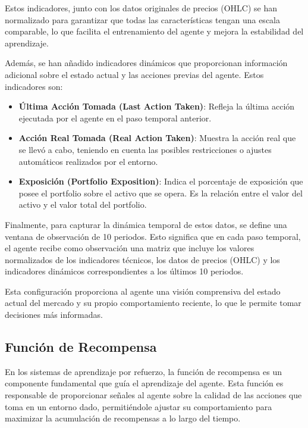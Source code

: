 \documentclass[a4paper,12pt, twoside]{report}
\begin{document}
Estos indicadores, junto con los datos originales de precios (OHLC) se han normalizado para 
garantizar que todas las características tengan una escala comparable, lo que facilita el 
entrenamiento del agente y mejora la estabilidad del aprendizaje.

Además, se han añadido indicadores dinámicos que proporcionan información adicional sobre 
el estado actual y las acciones previas del agente. Estos indicadores son:

\begin{itemize}
    \item \textbf{Última Acción Tomada (Last Action Taken)}: Refleja la última acción ejecutada 
    por el agente en el paso temporal anterior.

    \item \textbf{Acción Real Tomada (Real Action Taken)}: Muestra la acción real que se llevó a cabo, 
    teniendo en cuenta las posibles restricciones o ajustes automáticos realizados por el entorno.

    \item \textbf{Exposición (Portfolio Exposition)}: Indica el porcentaje de exposición que posee el portfolio
    sobre el activo que se opera. Es la relación entre el valor del activo y el valor total del portfolio.
\end{itemize}

Finalmente, para capturar la dinámica temporal de estos datos, se define una ventana de observación 
de 10 periodos. Esto significa que en cada paso temporal, el agente recibe como observación una 
matriz que incluye los valores normalizados de los indicadores técnicos, los datos de precios (OHLC) 
y los indicadores dinámicos correspondientes a los últimos 10 periodos. 

Esta configuración proporciona al agente una visión comprensiva del estado actual del mercado y 
su propio comportamiento reciente, lo que le permite tomar decisiones más informadas.

\subsection{Función de Recompensa}

En los sistemas de aprendizaje por refuerzo, la función de recompensa es un componente fundamental 
que guía el aprendizaje del agente. Esta función es responsable de proporcionar señales al agente 
sobre la calidad de las acciones que toma en un entorno dado, permitiéndole ajustar su comportamiento 
para maximizar la acumulación de recompensas a lo largo del tiempo. 
\end{document}
